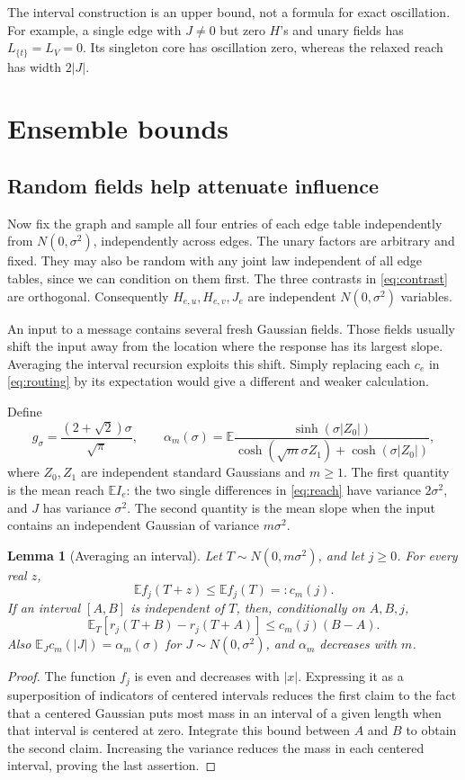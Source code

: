 \documentclass[11pt]{article}
\newtheorem{lemma}[theorem]{Lemma}
\theoremstyle{definition}
\theoremstyle{remark}
\newcommand{\E}{\mathbb E}
\begin{document}
The interval construction is an upper bound, not a formula for exact
oscillation. For example, a single edge with $J\ne0$ but zero $H$'s and
unary fields has $L_{\{t\}}=L_V=0$. Its singleton core has oscillation zero,
whereas the relaxed reach has width $2|J|$.

\clearpage
\section{Ensemble bounds}
\label{sec:ensemble}

\subsection{Random fields help attenuate influence}
Now fix the graph and sample all four entries of each edge table
independently from $N(0,\sigma^2)$, independently across edges. The unary
factors are arbitrary and fixed. They may also be random with any joint law
independent of all edge tables, since we can condition on them first.
The three contrasts in \eqref{eq:contrast} are orthogonal. Consequently
$H_{e,u},H_{e,v},J_e$ are independent $N(0,\sigma^2)$ variables.

An input to a message contains several fresh Gaussian fields. Those fields
usually shift the input away from the location where the response has its
largest slope. Averaging the interval recursion exploits this shift.
Simply replacing each $c_e$ in \eqref{eq:routing} by its expectation would
give a different and weaker calculation.

Define
\begin{equation}
 g_\sigma=\frac{(2+\sqrt2)\sigma}{\sqrt\pi},\qquad
 \alpha_m(\sigma)=\E\frac{\sinh(\sigma|Z_0|)}
 {\cosh(\sqrt m\sigma Z_1)+\cosh(\sigma|Z_0|)},
 \label{eq:alpha}
\end{equation}
where $Z_0,Z_1$ are independent standard Gaussians and $m\ge1$.
The first quantity is the mean reach $\E I_e$: the two single differences
in \eqref{eq:reach} have variance $2\sigma^2$, and $J$ has variance
$\sigma^2$. The second quantity is the mean slope when the input contains
an independent Gaussian of variance $m\sigma^2$.

\begin{lemma}[Averaging an interval]
\label{lem:average}
Let $T\sim N(0,m\sigma^2)$, and let $j\ge0$. For every real $z$,
\[
 \E f_j(T+z)\le\E f_j(T)=:c_m(j).
\]
If an interval $[A,B]$ is independent of $T$, then, conditionally on $A,B,j$,
\[
 \E_T[r_j(T+B)-r_j(T+A)]\le c_m(j)(B-A).
\]
Also $\E_J c_m(|J|)=\alpha_m(\sigma)$ for $J\sim N(0,\sigma^2)$,
and $\alpha_m$ decreases with $m$.
\end{lemma}
\begin{proof}
The function $f_j$ is even and decreases with $|x|$. Expressing it as a
superposition of indicators of centered intervals reduces the first claim
to the fact that a centered Gaussian puts most mass in an interval of a
given length when that interval is centered at zero. Integrate this bound
between $A$ and $B$ to obtain the second claim. Increasing the variance
reduces the mass in each centered interval, proving the last assertion.
\end{proof}
\end{document}
